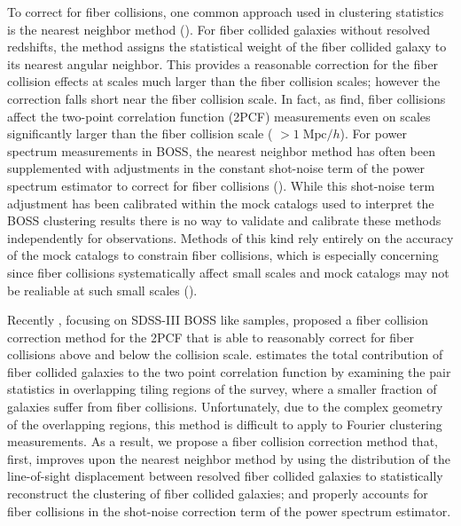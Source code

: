 \documentclass{emulateapj}
\begin{document}
To correct for fiber collisions, one common approach used in clustering statistics is the nearest neighbor method (\citealt{Zehavi:2002aa, Berlind:2006aa, Anderson:2012aa}). For fiber collided galaxies without resolved redshifts, the method assigns the statistical weight of the fiber collided galaxy to its nearest angular neighbor. This provides a reasonable correction for the fiber collision effects at scales much larger than the fiber collision scales; however the correction falls short near the fiber collision scale. In fact, as \cite{Zehavi:2005aa} find, fiber collisions affect the two-point correlation function (2PCF) measurements even on scales significantly larger than the fiber collision scale ( $> 1\;\mathrm{Mpc}/h$). For power spectrum measurements in BOSS, the nearest neighbor method has often been supplemented with adjustments in the constant shot-noise term of the power spectrum estimator to correct for fiber collisions (\citealt{Beutler:2014aa, Gil-Marin:2014aa}). While this shot-noise term adjustment has been calibrated within the mock catalogs used to interpret the BOSS clustering results there is no way to validate and calibrate these methods independently for observations. Methods of this kind rely entirely on the accuracy of the mock catalogs to constrain fiber collisions, which is especially concerning since fiber collisions systematically affect small scales and mock catalogs may not be realiable at such small scales (\citealt{Heitmann:2008aa, Schneider:2015aa}). 

Recently \cite{Guo:2012aa}, focusing on SDSS-III BOSS like samples, proposed a fiber collision correction method for the 2PCF that is able to reasonably correct for fiber collisions above and below the collision scale. \cite{Guo:2012aa} estimates the total contribution of fiber collided galaxies to the two point correlation function by examining the pair statistics in overlapping tiling regions of the survey, where a smaller fraction of galaxies suffer from fiber collisions. Unfortunately, due to the complex geometry of the overlapping regions, this method is difficult to apply to Fourier clustering measurements. As a result, we propose a fiber collision correction method that, first, improves upon the nearest neighbor method by using the distribution of the line-of-sight displacement between resolved fiber collided galaxies to statistically reconstruct the clustering of fiber collided galaxies; and properly accounts for fiber collisions in the shot-noise correction term of the power spectrum estimator. 
\end{document}
